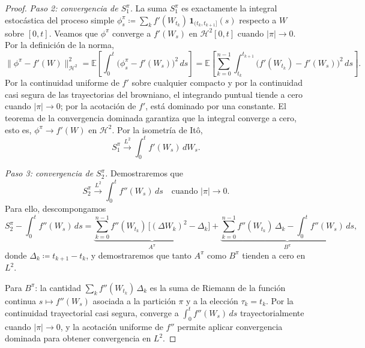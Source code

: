 \documentclass[11pt,a4paper,oneside]{report}
\theoremstyle{plain}
\theoremstyle{definition}
\theoremstyle{remark}
\newcommand{\E}{\mathbb{E}}
\newcommand{\1}{\mathbf{1}}
\newcommand{\eqdef}{\coloneqq}
\begin{document}
\begin{proof}
\emph{Paso 2: convergencia de $S_1^\pi$.} La suma $S_1^\pi$ es
exactamente la integral estocástica del proceso simple
$\phi^\pi_s \eqdef \sum_k f'(W_{t_k})\, \mathbf{1}_{(t_k, t_{k+1}]}(s)$
respecto a $W$ sobre $[0, t]$. Veamos que $\phi^\pi$ converge a
$f'(W_s)$ en $\mathcal{H}^2[0, t]$ cuando $|\pi| \to 0$. Por la
definición de la norma,
\begin{equation*}
  \|\phi^\pi - f'(W)\|_{\mathcal{H}^2}^2
  = \E\!\left[\int_0^t \bigl(\phi^\pi_s - f'(W_s)\bigr)^{\!2}\, ds\right]
  = \E\!\left[\sum_{k=0}^{n-1} \int_{t_k}^{t_{k+1}}
             \bigl(f'(W_{t_k}) - f'(W_s)\bigr)^{\!2}\, ds\right].
\end{equation*}
Por la continuidad uniforme de $f'$ sobre cualquier compacto y por la
continuidad casi segura de las trayectorias del browniano, el
integrando puntual tiende a cero cuando $|\pi| \to 0$; por la acotación
de $f'$, está dominado por una constante. El teorema de la convergencia
dominada garantiza que la integral converge a cero, esto es, $\phi^\pi
\to f'(W)$ en $\mathcal{H}^2$. Por la isometría de Itô,
\begin{equation*}
  S_1^\pi \xrightarrow{L^2} \int_0^t f'(W_s)\, dW_s.
\end{equation*}

\emph{Paso 3: convergencia de $S_2^\pi$.} Demostraremos que
\begin{equation*}
  S_2^\pi \xrightarrow{L^2} \int_0^t f''(W_s)\, ds
  \quad \text{cuando } |\pi| \to 0.
\end{equation*}
Para ello, descompongamos
\begin{equation*}
  S_2^\pi - \int_0^t f''(W_s)\, ds
  = \underbrace{\sum_{k=0}^{n-1} f''(W_{t_k})\,
                \bigl[(\Delta W_k)^2 - \Delta_k\bigr]}_{A^\pi}
  + \underbrace{\sum_{k=0}^{n-1} f''(W_{t_k})\, \Delta_k
              - \int_0^t f''(W_s)\, ds}_{B^\pi},
\end{equation*}
donde $\Delta_k \eqdef t_{k+1} - t_k$, y demostraremos que tanto
$A^\pi$ como $B^\pi$ tienden a cero en $L^2$.

Para $B^\pi$: la cantidad $\sum_k f''(W_{t_k})\, \Delta_k$ es la suma
de Riemann de la función continua $s \mapsto f''(W_s)$ asociada a la
partición $\pi$ y a la elección $\tau_k = t_k$. Por la continuidad
trayectorial casi segura, converge a $\int_0^t f''(W_s)\, ds$
trayectorialmente cuando $|\pi| \to 0$, y la acotación uniforme de
$f''$ permite aplicar convergencia dominada para obtener convergencia
en $L^2$.


\end{proof}
\end{document}
